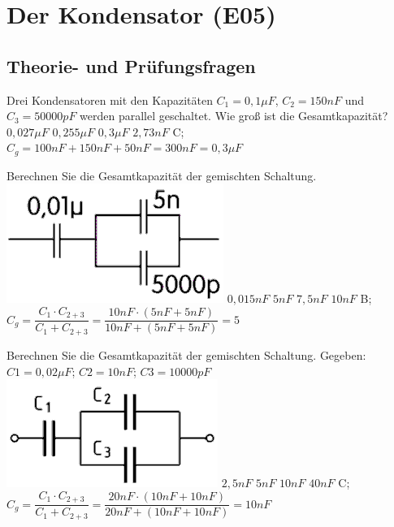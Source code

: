 \graphicspath{{e05_Kondensator/}}

\chapter{Der Kondensator (E05)}



\section{Theorie- und Prüfungsfragen}

{
Drei Kondensatoren mit den Kapazitäten $C_1 = 0,1\mu F$, $C_2 = 150nF$ und $C_3 = 50000pF$ werden parallel geschaltet. Wie groß ist die Gesamtkapazität?
}%
{$0,027\mu F$}%
{$0,255\mu F$}%
{$0,3\mu F$}%
{$2,73nF$}%
{C; $C_g = 100nF + 150nF + 50nF = 300nF = 0,3\mu F$}%


{
Berechnen Sie die Gesamtkapazität der gemischten Schaltung.\\
\includegraphics[scale=0.35]{TD105.png}
}%
{$0,015nF$}%
{$5nF$}%
{$7,5nF$}%
{$10nF$}%
{B; $C_g = \dfrac{C_1 \cdot C_{2+3}}{C_1 + C_{2+3}} = \dfrac{10nF \cdot (5nF + 5nF)}{10nF + (5nF + 5nF)} = 5$}%

{
Berechnen Sie die Gesamtkapazität der gemischten Schaltung. Gegeben: $C1 = 0,02\mu F$; $C2 = 10nF$; $C3 = 10000pF $ \\
\includegraphics[scale=0.35]{TD106.png}
}%
{$2,5nF$}%
{$5nF$}%
{$10nF$}%
{$40nF$}%
{C; $C_g = \dfrac{C_1 \cdot C_{2+3}}{C_1 + C_{2+3}} = \dfrac{20nF \cdot (10nF + 10nF)}{20nF + (10nF + 10nF)} = 10nF$}%

